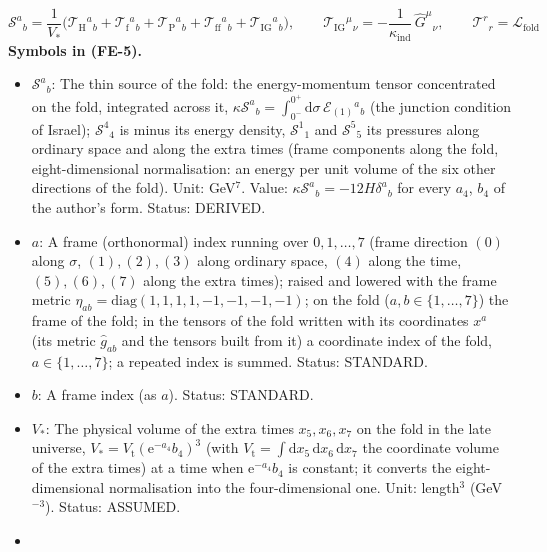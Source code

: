 \documentclass[
  10pt,
]{article}
\providecommand{\tightlist}{%
  \setlength{\itemsep}{0pt}\setlength{\parskip}{0pt}}
\begin{document}
\[
\mathcal{S}^a{}_b = \frac{1}{V_*}\Big(\mathcal{T}_{\mathrm{H}}{}^a{}_b + \mathcal{T}_{\mathrm{f}}{}^a{}_b
 + \mathcal{T}_{\mathrm{P}}{}^a{}_b + \mathcal{T}_{\mathrm{ff}}{}^a{}_b + \mathcal{T}_{\mathrm{IG}}{}^a{}_b\Big),\qquad
\mathcal{T}_{\mathrm{IG}}{}^\mu{}_\nu = -\frac{1}{\kappa_{\mathrm{ind}}}\,\hat G^\mu{}_\nu,\qquad
\mathcal{T}^r{}_r = \mathcal{L}_{\mathrm{fold}} \tag{FE-5}
\] \textbf{Symbols in (FE-5).}

\begin{itemize}
\tightlist
\item
  \(\mathcal{S}^a{}_b\): The thin source of the fold: the
  energy-momentum tensor concentrated on the fold, integrated across it,
  \(\kappa\mathcal{S}^a{}_b = \int_{0^-}^{0^+}\mathrm{d}\sigma\,\mathcal{E}_{(1)}{}^a{}_b\)
  (the junction condition of Israel); \(\mathcal{S}^4{}_4\) is minus its
  energy density, \(\mathcal{S}^1{}_1\) and \(\mathcal{S}^5{}_5\) its
  pressures along ordinary space and along the extra times (frame
  components along the fold, eight-dimensional normalisation: an energy
  per unit volume of the six other directions of the fold). Unit:
  GeV\(^7\). Value: \(\kappa\mathcal{S}^a{}_b = -12H\delta^a{}_b\) for
  every \(a_4\), \(b_4\) of the author's form. Status: DERIVED.
\item
  \(a\): A frame (orthonormal) index running over \(0, 1, \dots, 7\)
  (frame direction \((0)\) along \(\sigma\), \((1), (2), (3)\) along
  ordinary space, \((4)\) along the time, \((5), (6), (7)\) along the
  extra times); raised and lowered with the frame metric
  \(\eta_{ab} = \mathrm{diag}(1, 1, 1, 1, -1, -1, -1, -1)\); on the fold
  (\(a, b \in \{1, \dots, 7\}\)) the frame of the fold; in the tensors
  of the fold written with its coordinates \(x^a\) (its metric
  \(\hat g_{ab}\) and the tensors built from it) a coordinate index of
  the fold, \(a \in \{1, \dots, 7\}\); a repeated index is summed.
  Status: STANDARD.
\item
  \(b\): A frame index (as \(a\)). Status: STANDARD.
\item
  \(V_*\): The physical volume of the extra times \(x_5, x_6, x_7\) on
  the fold in the late universe,
  \(V_* = V_{\mathrm{t}}(\mathrm{e}^{-a_4}b_4)^3\) (with
  \(V_{\mathrm{t}} = \int\mathrm{d}x_5\,\mathrm{d}x_6\,\mathrm{d}x_7\)
  the coordinate volume of the extra times) at a time when
  \(\mathrm{e}^{-a_4}b_4\) is constant; it converts the
  eight-dimensional normalisation into the four-dimensional one. Unit:
  length\(^3\) (GeV\(^{-3}\)). Status: ASSUMED.
\item

\end{itemize}
\end{document}
